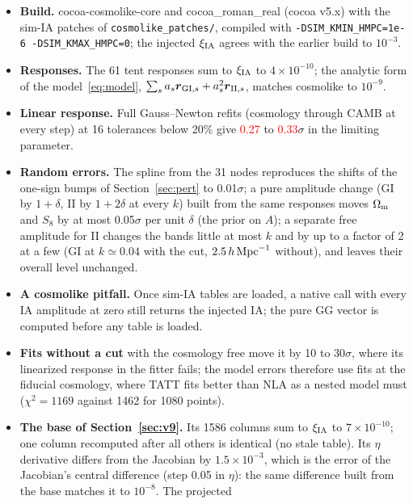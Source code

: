 \documentclass[11pt]{article}
\newcommand{\hMpc}{\,h\,{\rm Mpc}^{-1}}
\newcommand{\Om}{\Omega_{\rm m}}
\newcommand{\bvec}[1]{\boldsymbol{#1}}
\newif\ifnumbersfinal
\newcommand{\refresh}[1]{\ifnumbersfinal#1\else\textcolor{red}{#1}\fi}
\newcommand{\VerLo}{\refresh{0.27}}
\newcommand{\VerHi}{\refresh{0.33}}
\begin{document}
\begin{itemize}\sloppy
  \item \textbf{Build.} cocoa-cosmolike-core and cocoa\_roman\_real (cocoa
    v5.x) with the sim-IA patches of \texttt{cosmolike\_patches/}, compiled
    with \texttt{-DSIM\_KMIN\_HMPC=1e-6 -DSIM\_KMAX\_HMPC=0}; the injected
    $\xi_{\rm IA}$ agrees with the earlier build to $10^{-3}$.
  \item \textbf{Responses.} The 61 tent responses sum to $\xi_{\rm IA}$ to
    $4\times10^{-10}$; the analytic form of the model~\eqref{eq:model},
    $\sum_s a_s \bvec r_{{\rm GI},s} + a_s^2 \bvec r_{{\rm II},s}$, matches
    cosmolike to $10^{-9}$.
  \item \textbf{Linear response.} Full Gauss--Newton refits (cosmology
    through CAMB at every step) at 16 tolerances below 20\% give \VerLo{} to
    \VerHi$\sigma$ in the limiting parameter.
  \item \textbf{Random errors.} The spline from the 31 nodes reproduces the
    shifts of the one-sign bumps of Section~\ref{sec:pert} to 0.01$\sigma$;
    a pure amplitude change (GI by $1 + \delta$, II by $1 + 2\delta$ at every
    $k$) built from the same responses moves $\Om$ and $S_8$ by at most
    0.05$\sigma$ per unit $\delta$ (the prior on $A$); a separate free
    amplitude for II changes the bands little at most $k$ and by up to a
    factor of 2 at a few (GI at $k \simeq 0.04$ with the cut, $2.5\hMpc$
    without), and leaves their overall level unchanged.
  \item \textbf{A cosmolike pitfall.} Once sim-IA tables are loaded, a
    native call with every IA amplitude at zero still returns the injected
    IA; the pure GG vector is computed before any table is loaded.
  \item \textbf{Fits without a cut} with the cosmology free move it by 10
    to 30$\sigma$, where its linearized response in the fitter fails; the
    model errors therefore use fits at the fiducial cosmology, where TATT
    fits better than NLA as a nested model must ($\chi^2 = 1169$ against
    1462 for 1080 points).
  \item \textbf{The base of Section~\ref{sec:v9}.} Its 1586 columns sum to
    $\xi_{\rm IA}$ to $7\times10^{-10}$; one column recomputed after all
    others is identical (no stale table). Its $\eta$ derivative differs
    from the Jacobian by $1.5\times10^{-3}$, which is the error of the
    Jacobian's central difference (step 0.05 in $\eta$): the same
    difference built from the base matches it to $10^{-8}$. The projected

\end{itemize}
\end{document}
